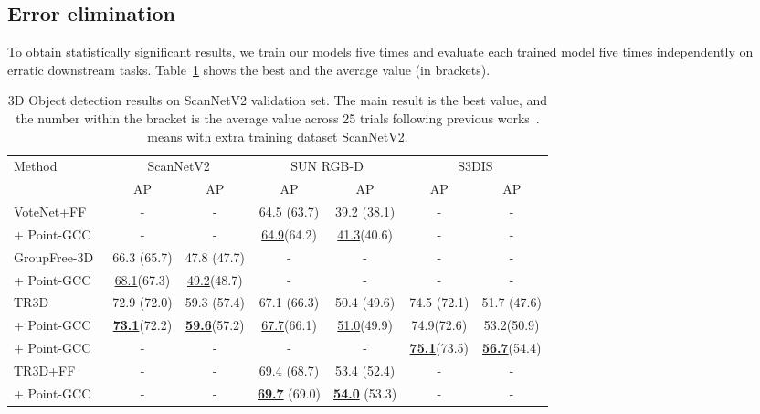 \documentclass{article}
\begin{document}
\subsection{Error elimination}
To obtain statistically significant results, we train our models five times and evaluate each trained model five times independently on erratic downstream tasks. Table~\ref{tab:error} shows the best and the average value (in brackets).
\begin{table}[h!]
\centering
\resizebox{0.9\linewidth}{!}
{
   \begin{tabular}{lcccccc}
    \toprule
    \multirow{2}{*}{Method} & \multicolumn{2}{c}{ScanNetV2} & \multicolumn{2}{c}{SUN RGB-D} & \multicolumn{2}{c}{S3DIS} \\
    \cmidrule(r){2-3}
    \cmidrule(r){4-5}
    \cmidrule(r){6-7}
     & AP & AP &  AP & AP &  AP & AP   \\     
    \midrule
    VoteNet+FF~\cite{TR3D} & - & - & 64.5 (63.7) & 39.2 (38.1) & - & - \\
    \rowcolor{linecolor2}+ Point-GCC & - & - & \underline{64.9}(64.2) & \underline{41.3}(40.6) & - & - \\
    \midrule
    GroupFree-3D~\cite{GroupFree} & 66.3 (65.7) & 47.8 (47.7) & - & - & - & - \\
    \rowcolor{linecolor2}+ Point-GCC & \underline{68.1}(67.3) & \underline{49.2}(48.7) & - & - & - & - \\
    \midrule
    TR3D~\cite{TR3D} & 72.9 (72.0) & 59.3 (57.4) & 67.1 (66.3) & 50.4 (49.6) & 74.5 (72.1) & 51.7 (47.6) \\
    \rowcolor{linecolor2}+ Point-GCC & \textbf{\underline{73.1}}(72.2) & \textbf{\underline{59.6}}(57.2) & \underline{67.7}(66.1) & \underline{51.0}(49.9) & 74.9(72.6) & 53.2(50.9) \\
    \rowcolor{linecolor}+ Point-GCC & - & - & - & - & \textbf{\underline{75.1}}(73.5) & \textbf{\underline{56.7}}(54.4) \\
    \midrule
    TR3D+FF~\cite{TR3D} & - & - & 69.4 (68.7) & 53.4 (52.4) & - & - \\
    \rowcolor{linecolor2}+ Point-GCC & - & - & \textbf{\underline{69.7}} (69.0) & \textbf{\underline{54.0}} (53.3) & - & - \\
    \bottomrule
  \end{tabular}
}
\caption{3D Object detection results on ScanNetV2 validation set. The main result is the best value, and the number within the bracket is the average value across 25 trials following previous works~\cite{GroupFree, TR3D}.  means with extra training dataset ScanNetV2.}
\vspace{-5pt}
\label{tab:error}
\end{table}
\end{document}
